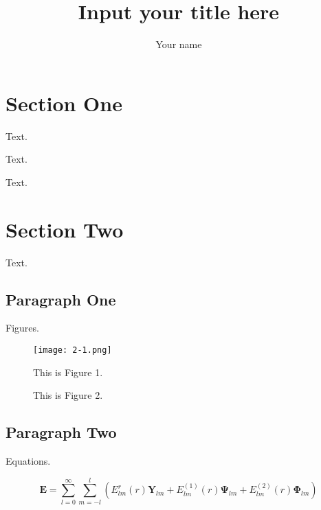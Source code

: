 \documentclass[11pt, a4paper]{article}
\title{{\Huge Input your title here}}
\author{Your name}
\numberwithin{equation}{section} %
\newcommand{\tcr}{\textcolor{blue}}
\newcommand{\upcite}[1]{\textsuperscript{\textsuperscript{\tcr{\cite{#1}}}}}
\begin{document}
\maketitle

\tableofcontents

\newpage

\section{Section One}

Text\upcite{ref1}.

Text\cite{ref1,ref2}.

Text.

\section{Section Two}

Text.

\subsection{Paragraph One}

Figures.

\begin{figure}[h]
	\centering
	\texttt{[image: 2-1.png]}
	\caption{This is Figure 1.}
\end{figure}

\begin{figure}[ht]
	\centering
	\hspace{0in}
	\caption{This is Figure 2.}
\end{figure}

\subsection{Paragraph Two}

Equations.

\begin{equation}
	\mathbf{E}=\sum_{l=0}^{\infty} \sum_{m=-l}^{l}\left(E_{l m}^{r}(r) \mathbf{Y}_{l m}+E_{l m}^{(1)}(r) \mathbf{\Psi}_{l m}+E_{l m}^{(2)}(r) \mathbf{\Phi}_{l m}\right)
\end{equation}
\end{document}
